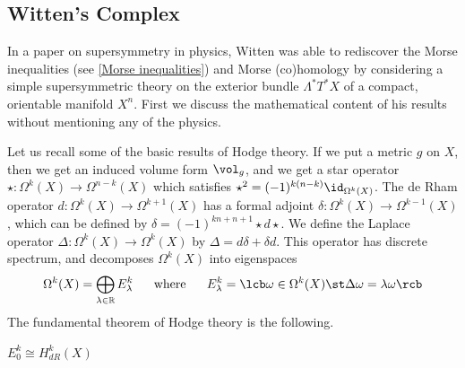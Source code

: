 \subsection{Witten's Complex}
\label{Witten's Complex}


In a paper on supersymmetry in physics, Witten was able to rediscover the Morse inequalities (see \cref{Morse inequalities}) and Morse (co)homology by considering a simple supersymmetric theory on the exterior bundle $\Lambda^* T^* X$ of a compact, orientable manifold $X^n$. First we discuss the mathematical content of his results without mentioning any of the physics.

Let us recall some of the basic results of Hodge theory. If we put a metric $g$ on $X$, then we get an induced volume form $\vol_g$, and we get a star operator $\star : \Omega^k(X) \rightarrow \Omega^{n-k}(X)$ which satisfies $\star^2 = (-1)^{k(n-k)} \id_{\Omega^k(X)}$. The de Rham operator $d : \Omega^k(X) \rightarrow \Omega^{k+1}(X)$ has a formal adjoint $\delta : \Omega^k(X) \rightarrow \Omega^{k-1}(X)$, which can be defined by $\delta = (-1)^{kn+n+1} \star d \star$. We define the Laplace operator $\Delta : \Omega^k(X) \rightarrow \Omega^k(X)$ by $\Delta = d\delta+\delta d$. This operator has discrete spectrum, and decomposes $\Omega^k(X)$ into eigenspaces
\[ \Omega^k(X) = \bigoplus_{\lambda \in \mathbb R} E_\lambda^k \ \ \ \ \ \text{where} \ \ \ \ \ E_\lambda^k = \lcb \omega \in \Omega^k(X) \st \Delta \omega = \lambda \omega \rcb \]
The fundamental theorem of Hodge theory is the following.
\begin{thm}
$E_0^k \cong H_{dR}^k(X)$
\end{thm}

